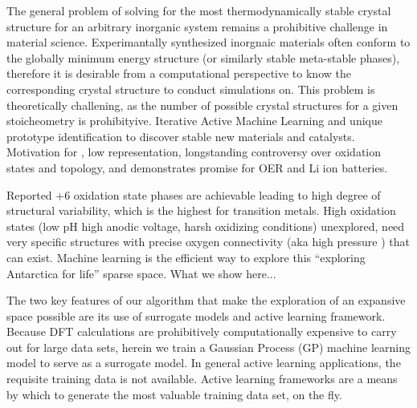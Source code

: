 

The general problem of solving for the most thermodynamically stable crystal structure for an arbitrary inorganic system remains a prohibitive challenge in material science.
Experimantally synthesized inorgnaic materials often conform to the globally minimum energy structure (or similarly stable meta-stable phases),
therefore it is desirable from a computational perspective to know the corresponding crystal structure to conduct simulations on.
This problem is theoretically challening, as the number of possible crystal structures for a given stoicheometry is prohibityive.
Iterative Active Machine Learning and unique prototype identification to discover stable new materials and catalysts.
Motivation for , low representation, longstanding controversy over oxidation states and topology, and demonstrates promise for OER and Li ion batteries.

Reported +6 oxidation state phases are achievable leading to high degree of structural variability, which is the highest for transition metals.
High oxidation states (low pH high anodic voltage, harsh oxidizing conditions) unexplored, need very specific structures with precise oxygen connectivity (aka high pressure ) that can exist.
Machine learning is the efficient way to explore this “exploring Antarctica for life” sparse space.
What we show here...

The two key features of our algorithm that make the exploration of an expansive space possible are its use of surrogate models and active learning framework.
Because DFT calculations are prohibitively computationally expensive to carry out for large data sets, herein we train a Gaussian Process (GP) machine learning model to serve as a surrogate model.
In general active learning applications, the requisite training data is not available.
Active learning frameworks are a means by which to generate the most valuable training data set, on the fly.


